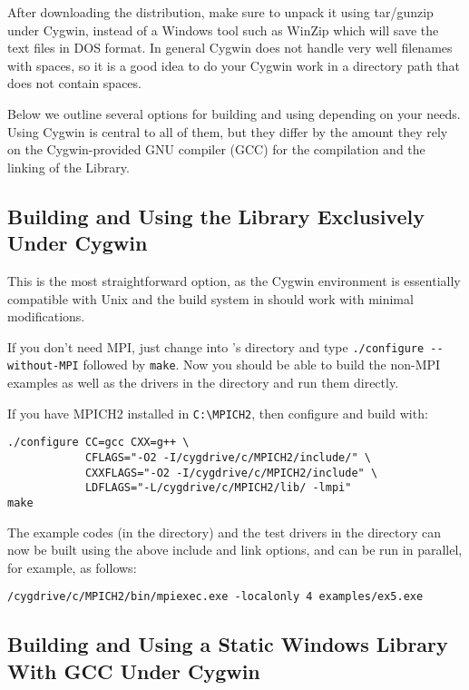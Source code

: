After downloading the \hypre{} distribution, make sure to unpack it using
tar/gunzip under Cygwin, instead of a Windows tool such as WinZip which will
save the text files in DOS format. In general Cygwin does not handle very well
filenames with spaces, so it is a good idea to do your Cygwin work in a
directory path that does not contain spaces.

Below we outline several options for building and using \hypre{} depending on
your needs.  Using Cygwin is central to all of them, but they differ by the
amount they rely on the Cygwin-provided GNU compiler (GCC) for the compilation
and the linking of the Library.

\subsection{Building and Using the Library Exclusively Under Cygwin}

This is the most straightforward option, as the Cygwin environment is
essentially compatible with Unix and the build system in \hypre{} should work
with minimal modifications.

If you don't need MPI, just change into \hypre{}'s  directory and type
\verb|./configure --without-MPI| followed by \verb|make|. Now you should be able
to build the non-MPI examples as well as the drivers in the  directory
and run them directly.

If you have MPICH2 installed in \verb|C:\MPICH2|, then configure and build
\hypre{} with:
\begin{verbatim}
./configure CC=gcc CXX=g++ \
            CFLAGS="-O2 -I/cygdrive/c/MPICH2/include/" \
            CXXFLAGS="-O2 -I/cygdrive/c/MPICH2/include" \
            LDFLAGS="-L/cygdrive/c/MPICH2/lib/ -lmpi"
make
\end{verbatim}

The example codes (in the  directory) and the test drivers in the
\kbd{test} directory can now be built using the above include and link options,
and can be run in parallel, for example, as follows:
\begin{verbatim}
/cygdrive/c/MPICH2/bin/mpiexec.exe -localonly 4 examples/ex5.exe
\end{verbatim}

\subsection{Building and Using a Static Windows Library With GCC Under Cygwin}

